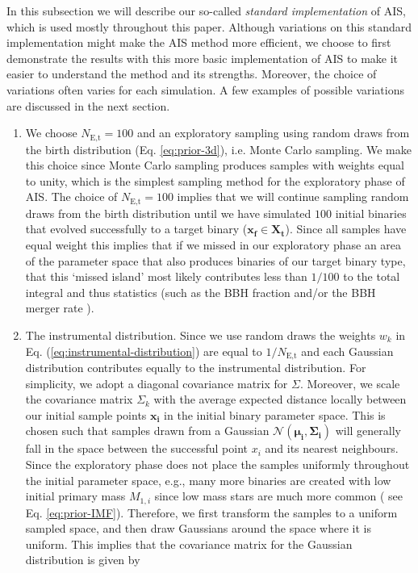 \documentclass[a4paper,fleqn,usenatbib]{mnras}
\begin{document}
In this subsection we will describe our so-called \emph{standard implementation} of AIS, which is used mostly throughout this paper. Although variations on this standard implementation might make the AIS method more efficient, we choose to first demonstrate the results with this more basic implementation of AIS to make it easier to understand the method and its strengths. Moreover, the choice of variations often varies for each simulation. A few examples of possible variations are discussed in the next section. 

\begin{enumerate}
	\item We choose $ N_{\text{E,t}} = 100 $ and an exploratory sampling using random draws from the birth distribution (Eq. \ref{eq:prior-3d}), i.e. Monte Carlo sampling.  We make this choice since Monte Carlo sampling produces samples with weights equal to unity, which  is the simplest sampling method for the exploratory phase of AIS. The choice of $ N_{\text{E,t}} = 100 $ implies that we will continue sampling random draws from the birth distribution until we have simulated $100$ initial binaries that evolved successfully to a target binary ($\mathbf{x_f} \in \mathbf{X_t}$). Since all samples have equal weight this implies that if we missed in our exploratory phase an area of the parameter space that also produces binaries of our target binary type, that this `missed island' most likely contributes less than $1/100$ to the total integral and thus statistics (such as the BBH fraction and/or the BBH merger rate ). 
	
	\item The instrumental distribution. Since we use random draws the weights $w_k$ in Eq. (\ref{eq:instrumental-distribution}) are equal to $ 1 / N_{\text{E,t}} $ and each Gaussian distribution contributes equally to the instrumental distribution. 
For simplicity, we  adopt a diagonal covariance matrix for $\Sigma$. Moreover, we scale the covariance matrix $\Sigma_k$  with the average expected distance locally between our initial sample points $ \mathbf{x_i}$ in the initial binary parameter space. This is chosen such that samples drawn from a Gaussian $\mathcal{N}({\boldsymbol {\mu _{i},\Sigma _{i}}})$  will generally fall in the space between the successful point  $x_i$ and its nearest neighbours.  Since the exploratory phase does not place the samples uniformly throughout the initial parameter space, e.g., many more binaries are created with low initial primary mass $M_{1,i}$ since low mass stars are much more common ( see  Eq. \ref{eq:prior-IMF}).
Therefore, we first transform the samples to a uniform sampled space, and then draw Gaussians around the space where it is uniform. This implies that the covariance matrix for the Gaussian distribution is given by


\end{enumerate}
\end{document}
